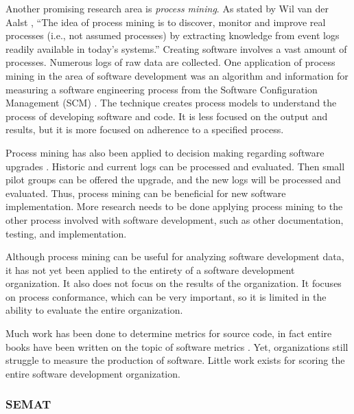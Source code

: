 \documentclass[SDSUThesis.tex]{subfiles}
\begin{document}
    Another promising research area is \textit{process mining}.
    As stated by Wil van der Aalst \cite{vanderAalst2011}, 
    ``The idea of process mining is to discover, monitor
    and improve real
    processes (i.e., not assumed processes) by extracting knowledge from event logs
    readily available in today's systems.''  Creating software involves
    a vast amount of processes.  Numerous logs of raw data are collected.  
    One application of process mining in the area of software development
    was an algorithm and information for measuring a software engineering process from
    the Software Configuration Management (SCM) \cite{Rubin2007}.
    The technique creates process models 
    to understand the process of developing software and code. 
    It is less focused on the output and results,
    but it is more focused on adherence to a specified process.
    
    Process mining has also been applied to decision making regarding software 
    upgrades \cite{Genuchten2014}.  Historic and current logs can be 
    processed and evaluated.
    Then small pilot groups can be offered the upgrade, and the new logs will 
    be processed and evaluated. Thus, process mining can be beneficial for new 
    software implementation.  More research needs to be done applying
    process mining to the other process involved with software development,
    such as other documentation, testing, and implementation. 
    
    Although process mining can be useful for analyzing software
    development data, it has not yet been applied to the entirety 
    of a software development organization. It also does not
    focus on the results of the organization.  It focuses
    on process conformance, which can be very important, so it
    is limited in the ability to evaluate the entire organization. 

    Much work has been done to determine metrics for source code, in fact 
    entire books have been written on the topic of software 
    metrics \cite{Jones1996, Putnam2013}. Yet, 
    organizations still struggle to measure the production of software.
    Little work exists
    for scoring the entire software development organization. 

\subsubsection{SEMAT}
\end{document}
